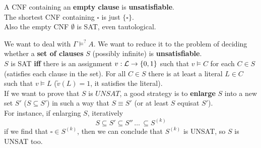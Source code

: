 A CNF containing an \textbf{empty clause} is \textbf{unsatisfiable}.\\
The shortest CNF containing $\square$ is just $\{\square\}$.\\
Also the empty CNF $\emptyset$ is SAT, even tautological.\\

\newpage

We want to deal with $\Gamma \models^? A$. We want to reduce it to the problem of deciding whether a \textbf{set of clauses} $S$ (possibly infinite) is \textbf{unsatisfiable}.\\

$S$ is SAT \textbf{iff} there is an assignment $v: \mathcal{L} \rightarrow \{0,1\}$ such that $v \models C$ for each $C \in S$ (satisfies each clause in the set). For all $C \in S$ there is at least a literal $L \in C$ such that $v \models L$ ($\tilde v (L) = 1$, it satisfies the literal).\\

If we want to prove that $S$ is $UNSAT$, a good strategy is to \textbf{enlarge} $S$ into a new set $S'$ ($S \subseteq S'$) in such a way that $S \equiv S'$ (or at least $S$ equisat $S'$).\\

For instance, if enlarging $S$, iteratively 
$$ S \subseteq S' \subseteq S'' \, \dots \, \subseteq S^{(k)}$$
if we find that $\square \in S^{(k)}$, then we can conclude that $S^{(k)}$ is UNSAT, so $S$ is UNSAT too.\\

\newpage